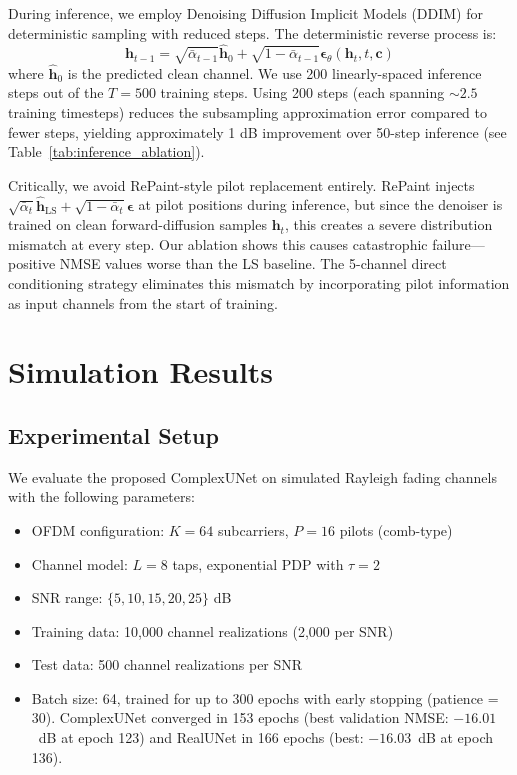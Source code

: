 \documentclass[conference]{IEEEtran}
\begin{document}
During inference, we employ Denoising Diffusion Implicit Models (DDIM) \cite{song2021denoising} for deterministic sampling with reduced steps. The deterministic reverse process is:
\begin{equation}
\mathbf{h}_{t-1} = \sqrt{\bar{\alpha}_{t-1}} \hat{\mathbf{h}}_0 + \sqrt{1 - \bar{\alpha}_{t-1}} \boldsymbol{\epsilon}_\theta(\mathbf{h}_t, t, \mathbf{c})
\end{equation}
where $\hat{\mathbf{h}}_0$ is the predicted clean channel. We use 200 linearly-spaced inference steps out of the $T = 500$ training steps. Using 200 steps (each spanning ${\sim}2.5$ training timesteps) reduces the subsampling approximation error compared to fewer steps, yielding approximately 1 dB improvement over 50-step inference (see Table~\ref{tab:inference_ablation}).

Critically, we avoid RePaint-style pilot replacement entirely. RePaint injects $\sqrt{\bar{\alpha}_t}\hat{\mathbf{h}}_{\mathrm{LS}} + \sqrt{1{-}\bar{\alpha}_t}\boldsymbol{\epsilon}$ at pilot positions during inference, but since the denoiser is trained on clean forward-diffusion samples $\mathbf{h}_t$, this creates a severe distribution mismatch at every step. Our ablation shows this causes catastrophic failure—positive NMSE values worse than the LS baseline. The 5-channel direct conditioning strategy eliminates this mismatch by incorporating pilot information as input channels from the start of training.

\section{Simulation Results}

\subsection{Experimental Setup}

We evaluate the proposed ComplexUNet on simulated Rayleigh fading channels with the following parameters:
\begin{itemize}
\item OFDM configuration: $K = 64$ subcarriers, $P = 16$ pilots (comb-type)
\item Channel model: $L = 8$ taps, exponential PDP with $\tau = 2$
\item SNR range: $\{5, 10, 15, 20, 25\}$ dB
\item Training data: 10,000 channel realizations (2,000 per SNR)
\item Test data: 500 channel realizations per SNR
\item Batch size: 64, trained for up to 300 epochs with early stopping (patience = 30). ComplexUNet converged in 153 epochs (best validation NMSE: $-16.01$~dB at epoch 123) and RealUNet in 166 epochs (best: $-16.03$~dB at epoch 136).
\end{itemize}
\end{document}
